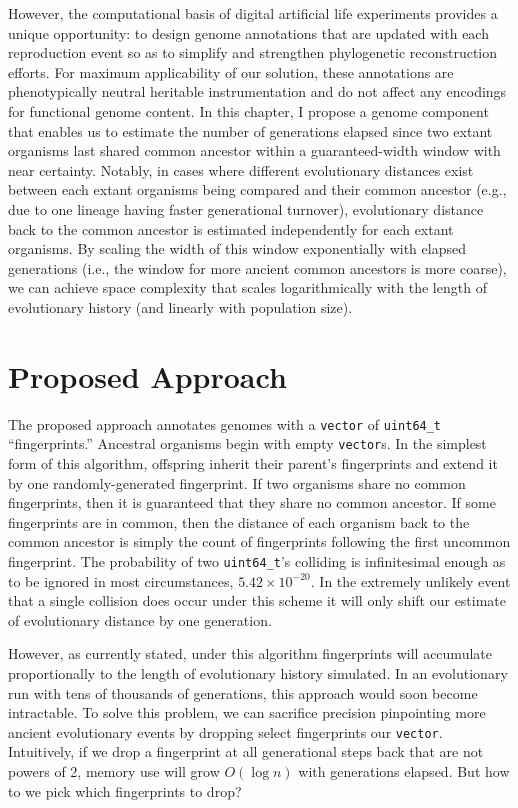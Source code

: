However, the computational basis of digital artificial life experiments provides a unique opportunity: to design genome annotations that are updated with each reproduction event so as to simplify and strengthen phylogenetic reconstruction efforts.
For maximum applicability of our solution, these annotations are phenotypically neutral heritable instrumentation \citep{stanley2002evolving} and do not affect any encodings for functional genome content.
In this chapter, I propose a genome component that enables us to estimate the number of generations elapsed since two extant organisms last shared common ancestor within a guaranteed-width window with near certainty.
Notably, in cases where different evolutionary distances exist between each extant organisms being compared and their common ancestor (e.g., due to one lineage having faster generational turnover), evolutionary distance back to the common ancestor is estimated independently for each extant organisms.
By scaling the width of this window exponentially with elapsed generations (i.e., the window for more ancient common ancestors is more coarse), we can achieve space complexity that scales logarithmically with the length of evolutionary history (and linearly with population size).

\section{Proposed Approach}

The proposed approach annotates genomes with a \texttt{vector} of \texttt{uint64\_t} ``fingerprints.''
Ancestral organisms begin with empty \texttt{vector}s.
In the simplest form of this algorithm, offspring inherit their parent's fingerprints and extend it by one randomly-generated fingerprint.
If two organisms share no common fingerprints, then it is guaranteed that they share no common ancestor.
If some fingerprints are in common, then the distance of each organism back to the common ancestor is simply the count of fingerprints following the first uncommon fingerprint.
The probability of two \texttt{uint64\_t}'s colliding is infinitesimal enough as to be ignored in most circumstances, $5.42\times10^{-20}$.
In the extremely unlikely event that a single collision does occur under this scheme it will only shift our estimate of evolutionary distance by one generation.

However, as currently stated, under this algorithm fingerprints will accumulate proportionally to the length of evolutionary history simulated.
In an evolutionary run with tens of thousands of generations, this approach would soon become intractable.
To solve this problem, we can sacrifice precision pinpointing more ancient evolutionary events by dropping select fingerprints our \texttt{vector}.
Intuitively, if we drop a fingerprint at all generational steps back that are not powers of 2, memory use will grow $O(\log n)$ with generations elapsed.
But how to we pick which fingerprints to drop?

